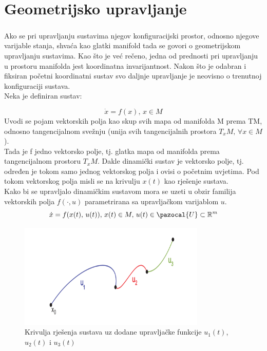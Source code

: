 \documentclass[times, utf8, diplomski]{fer}
\newcommand{\Ua}{\pazocal{U}}
\begin{document}
\chapter{Geometrijsko upravljanje}
	
	\paragraph{}Ako se pri upravljanju sustavima njegov konfiguracijski prostor, odnosno njegove varijable stanja, shvaća kao glatki manifold tada se govori o geometrijskom upravljanju sustavima. Kao što je već rečeno, jedna od prednosti pri upravljanju u prostoru manifolda jest koordinatna invarijantnost. Nakon što je odabran i fiksiran početni koordinatni sustav svo daljnje upravljanje je neovisno o trenutnoj konfiguraciji sustava. \\
	Neka je definiran sustav:
	
	\begin{equation}
		\dot{x}=f(x), \, x \in M
	\end{equation}
	Uvodi se pojam vektorskih polja kao skup svih mapa od manifolda M prema TM, odnosno tangencijalnom svežnju (unija svih tangencijalnih prostora $T_xM ,\, \forall x\in M$). \\
	Tada je f jedno vektorsko polje, tj. glatka mapa od manifolda prema tangencijalnom prostoru $T_xM$. Dakle dinamički sustav je vektorsko polje, tj. određen je tokom samo jednog vektorskog polja i ovisi o početnim uvjetima. Pod tokom vektorskog polja misli se na krivulju $x(t)$ kao rješenje sustava. \\
	Kako bi se upravljalo dinamičkim sustavom mora se uzeti u obzir familija vektorskih polja $f(\cdot, u)$ parametrirana sa upravljačkom varijablom $u$. \\
	\begin{equation}
		\dot{x} = f(x(t),\, u(t)), \, x(t)\in M, \, u(t)\in \Ua \subset \mathbb{R}^m
	\end{equation}
	\begin{figure}[h!]
		\includegraphics[width=\textwidth, height=5cm]{figures/krivulja.png}
		\caption{Krivulja rješenja sustava uz dodane upravljačke funkcije $u_1(t)$, $u_2(t)$ i $u_3(t)$}
	\end{figure}
	
\end{document}
